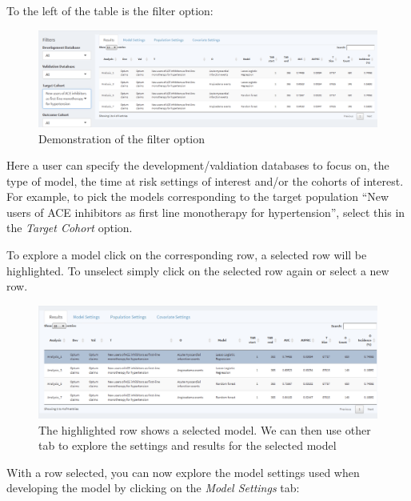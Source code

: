 \documentclass[11pt]{book}
\begin{document}
To the left of the table is the filter option:

\begin{figure}

{\centering \includegraphics[width=0.8\linewidth]{images/PatientLevelPrediction/shiny/shinyFilter} 

}

\caption{Demonstration of the filter option}\label{fig:shinyFilter}
\end{figure}

Here a user can specify the development/valdiation databases to focus
on, the type of model, the time at risk settings of interest and/or the
cohorts of interest. For example, to pick the models corresponding to
the target population ``New users of ACE inhibitors as first line
monotherapy for hypertension'', select this in the \emph{Target Cohort}
option.

To explore a model click on the corresponding row, a selected row will
be highlighted. To unselect simply click on the selected row again or
select a new row.

\begin{figure}

{\centering \includegraphics[width=0.8\linewidth]{images/PatientLevelPrediction/shiny/shinySelect} 

}

\caption{The highlighted row shows a selected model.  We can then use other tab to explore the settings and results for the selected model}\label{fig:shinySelect}
\end{figure}

With a row selected, you can now explore the model settings used when
developing the model by clicking on the \emph{Model Settings} tab:
\end{document}
